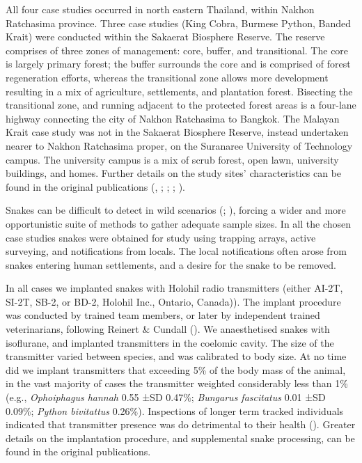 \documentclass[10pt,a4paper]{article}
\begin{document}
All four case studies occurred in north eastern Thailand, within Nakhon Ratchasima province.
Three case studies (King Cobra, Burmese Python, Banded Krait) were conducted within the Sakaerat Biosphere Reserve.
The reserve comprises of three zones of management: core, buffer, and transitional.
The core is largely primary forest; the buffer surrounds the core and is comprised of forest regeneration efforts, whereas the transitional zone allows more development resulting in a mix of agriculture, settlements, and plantation forest.
Bisecting the transitional zone, and running adjacent to the protected forest areas is a four-lane highway connecting the city of Nakhon Ratchasima to Bangkok.
The Malayan Krait case study was not in the Sakaerat Biosphere Reserve, instead undertaken nearer to Nakhon Ratchasima proper, on the Suranaree University of Technology campus.
The university campus is a mix of scrub forest, open lawn, university buildings, and homes.
Further details on the study sites' characteristics can be found in the original publications (, ; ; ; ).

Snakes can be difficult to detect in wild scenarios (; ), forcing a wider and more opportunistic suite of methods to gather adequate sample sizes.
In all the chosen case studies snakes were obtained for study using trapping arrays, active surveying, and notifications from locals.
The local notifications often arose from snakes entering human settlements, and a desire for the snake to be removed.

In all cases we implanted snakes with Holohil radio transmitters (either AI-2T, SI-2T, SB-2, or BD-2, Holohil Inc., Ontario, Canada)).
The implant procedure was conducted by trained team members, or later by independent trained veterinarians, following Reinert \& Cundall ().
We anaesthetised snakes with isoflurane, and implanted transmitters in the coelomic cavity.
The size of the transmitter varied between species, and was calibrated to body size.
At no time did we implant transmitters that exceeding 5\% of the body mass of the animal, in the vast majority of cases the transmitter weighted considerably less than 1\% (e.g., \emph{Ophoiphagus hannah} 0.55 ±SD 0.47\%; \emph{Bungarus fascitatus} 0.01 ±SD 0.09\%; \emph{Python bivitattus} 0.26\%).
Inspections of longer term tracked individuals indicated that transmitter presence was do detrimental to their health ().
Greater details on the implantation procedure, and supplemental snake processing, can be found in the original publications.
\end{document}
